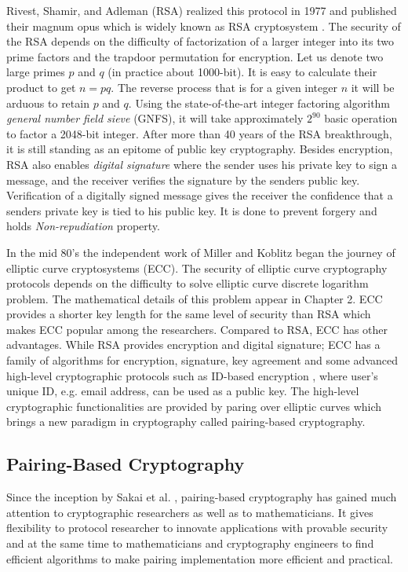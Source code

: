 Rivest, Shamir, and Adleman (RSA) realized this protocol in 1977 and published their magnum opus which is widely known as RSA cryptosystem \cite{rivest1978method}. 
The security of the RSA depends on the difficulty of factorization of a larger integer into its two prime factors and the trapdoor permutation for encryption.
Let us denote two large primes $p$ and $q$ (in practice about 1000-bit).
It is easy to calculate their product to get $n = pq$.
The reverse process that is for a given integer $n$ it will be arduous to retain $p$ and $q$.
Using the state-of-the-art integer factoring algorithm \textit{general number field sieve }(GNFS), it will take approximately $2^{90}$ basic operation to factor a 2048-bit integer.
After more than 40 years of the RSA breakthrough, it is still standing as an epitome of public key cryptography.
Besides encryption, RSA also enables \textit{digital signature }where the sender uses his private key to sign a message, and the receiver verifies the signature by the senders public key. 
Verification of a digitally signed message gives the receiver the confidence that a senders private key is tied to his public key.
It is done to prevent forgery and holds \textit{Non-repudiation} property.

In the mid 80's the independent work of Miller \cite{C:Miller85} and Koblitz \cite{koblitz1987elliptic} began the journey of elliptic curve cryptosystems (ECC). 
The security of elliptic curve cryptography protocols depends on the difficulty to solve elliptic curve discrete logarithm problem.
The mathematical details of this problem appear in Chapter 2. %
ECC provides a shorter key length for the same level of security than RSA which makes ECC  popular among the researchers. 
Compared to RSA, ECC has other advantages. 
While RSA provides encryption and digital signature; ECC has a family of algorithms for encryption, signature, key agreement and some advanced high-level cryptographic protocols such as ID-based encryption \cite{AC:BonLynSha01}, where user's unique ID, e.g. email address, can be used as a public key. 
The high-level cryptographic functionalities are provided by paring over elliptic curves \cite{book_GPCMrabet2016} which brings a new paradigm in cryptography called pairing-based cryptography.

\subsection{Pairing-Based Cryptography}
\label{ch1_subsec_pbc}
Since the inception by Sakai et al. \cite{sakai2000cryptosystems}, pairing-based cryptography has gained much attention to cryptographic researchers as well as  to mathematicians. It gives flexibility to protocol researcher to innovate applications with provable security and at the same time to mathematicians and cryptography engineers to find efficient algorithms to make pairing implementation more efficient and practical.

